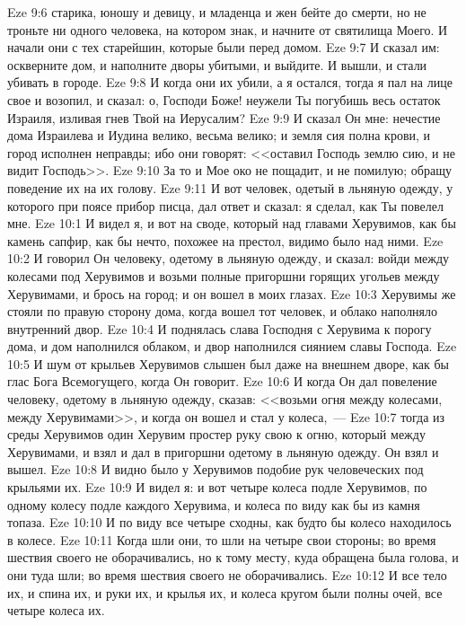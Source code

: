 \vs Eze 9:6 старика, юношу и девицу, и младенца и жен бейте до смерти, но не троньте ни одного человека, на котором знак, и начните от святилища Моего. И начали они с тех старейшин, которые были перед домом.
\vs Eze 9:7 И сказал им: оскверните дом, и наполните дворы убитыми, и выйдите. И вышли, и стали убивать в городе.
\vs Eze 9:8 И когда они их убили, а я остался, тогда я пал на лице свое и возопил, и сказал: о, Господи Боже! неужели Ты погубишь весь остаток Израиля, изливая гнев Твой на Иерусалим?
\vs Eze 9:9 И сказал Он мне: нечестие дома Израилева и Иудина велико, весьма велико; и земля сия полна крови, и город исполнен неправды; ибо они говорят: <<оставил Господь землю сию, и не видит Господь>>.
\vs Eze 9:10 За то и Мое око не пощадит, и не помилую; обращу поведение их на их голову.
\vs Eze 9:11 И вот человек, одетый в льняную одежду, у которого при поясе прибор писца, дал ответ и сказал: я сделал, как Ты повелел мне.
\vs Eze 10:1 И видел я, и вот на своде, который над главами Херувимов, как бы камень сапфир, как бы нечто, похожее на престол, видимо было над ними.
\vs Eze 10:2 И говорил Он человеку, одетому в льняную одежду, и сказал: войди между колесами под Херувимов и возьми полные пригоршни горящих угольев между Херувимами, и брось на город; и он вошел в моих глазах.
\vs Eze 10:3 Херувимы же стояли по правую сторону дома, когда вошел тот человек, и облако наполняло внутренний двор.
\vs Eze 10:4 И поднялась слава Господня с Херувима к порогу дома, и дом наполнился облаком, и двор наполнился сиянием славы Господа.
\vs Eze 10:5 И шум от крыльев Херувимов слышен был даже на внешнем дворе, как бы глас Бога Всемогущего, когда Он говорит.
\vs Eze 10:6 И когда Он дал повеление человеку, одетому в льняную одежду, сказав: <<возьми огня между колесами, между Херувимами>>, и когда он вошел и стал у колеса,~---
\vs Eze 10:7 тогда из среды Херувимов один Херувим простер руку свою к огню, который между Херувимами, и взял и дал в пригоршни одетому в льняную одежду. Он взял и вышел.
\vs Eze 10:8 И видно было у Херувимов подобие рук человеческих под крыльями их.
\vs Eze 10:9 И видел я: и вот четыре колеса подле Херувимов, по одному колесу подле каждого Херувима, и колеса по виду как бы из камня топаза.
\vs Eze 10:10 И по виду все четыре сходны, как будто бы колесо находилось в колесе.
\vs Eze 10:11 Когда шли они, то шли на четыре свои стороны; во время шествия своего не оборачивались, но к тому месту, куда обращена была голова, и они туда шли; во время шествия своего не оборачивались.
\vs Eze 10:12 И все тело их, и спина их, и руки их, и крылья их, и колеса кругом были полны очей, все четыре колеса их.
